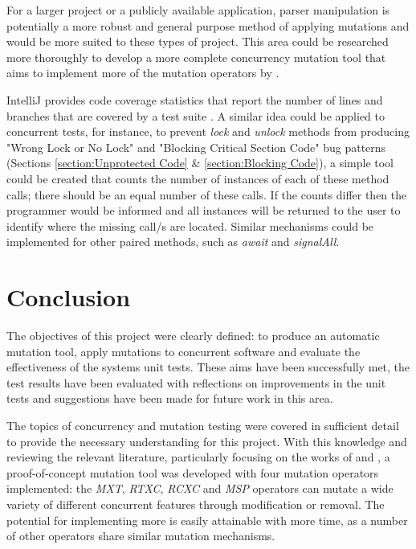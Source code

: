 \documentclass[a4paper,12pt]{article}
\begin{document}
For a larger project or a publicly available application, parser manipulation is potentially a more robust and general purpose method of applying mutations and would be more suited to these types of project. This area could be researched more thoroughly to develop a more complete concurrency mutation tool that aims to implement more of the mutation operators by \citet{bradbury06}.   
     
IntelliJ provides code coverage statistics that report the number of lines and branches that are covered by a test suite \citep{jetbrains19}. A similar idea could be applied to concurrent tests, for instance, to prevent \textit{lock} and \textit{unlock} methods from producing "Wrong Lock or No Lock" and "Blocking Critical Section Code" bug patterns (Sections \ref{section:Unprotected Code} \& \ref{section:Blocking Code}), a simple tool could be created that counts the number of instances of each of these method calls; there should be an equal number of these calls. If the counts differ then the programmer would be informed and all instances will be returned to the user to identify where the missing call/s are located. Similar mechanisms could be implemented for other paired methods, such as \textit{await} and \textit{signalAll}. 


\newpage
\section{Conclusion} \label{section:Conclusion}

The objectives of this project were clearly defined: to produce an automatic mutation tool, apply mutations to concurrent software and evaluate the effectiveness of the systems unit tests. These aims have been successfully met, the test results have been evaluated with reflections on improvements in the unit tests and suggestions have been made for future work in this area.

The topics of concurrency and mutation testing were covered in sufficient detail to provide the necessary understanding for this project. With this knowledge and reviewing the relevant literature, particularly focusing on the works of \citet{farchi03} and \citet{bradbury06}, a proof-of-concept mutation tool was developed with four mutation operators implemented: the \textit{MXT}, \textit{RTXC}, \textit{RCXC} and \textit{MSP} operators can mutate a wide variety of different concurrent features through modification or removal. The potential for implementing more is easily attainable with more time, as a number of other operators share similar mutation mechanisms. 
\end{document}
